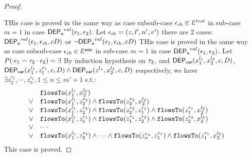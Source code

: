 \begin{proof}
\begin{enumerate}
\end{enumerate}
%
THis case is proved in the same way as case subsub-case $\mathtt{\epsilon}_{ih} \in \mathcal{E}^{test}$ in sub-case $m = 1$ in case $\mathsf{DEP_{\mathtt{e}}}^{val}(\mathtt{\epsilon}_1, \mathtt{\epsilon}_2)$.
%
Let $\mathtt{\epsilon}_{ih} = (z, l', n', v')$  there are 2 cases:
$\mathsf{DEP_{\mathtt{e}}}^{val}(\mathtt{\epsilon}_1, \mathtt{\epsilon}_{ih}, c D)$ or $\neg \mathsf{DEP_{\mathtt{e}}}^{val}(\mathtt{\epsilon}_1, \mathtt{\epsilon}_{ih}, c D)$
%
%
THis case is proved in the same way as case subsub-case $\mathtt{\epsilon}_{ih} \in \mathcal{E}^{\mathtt{{asn}}}$ in sub-case $m = 1$ in case $\mathsf{DEP_{\mathtt{e}}}^{val}(\mathtt{\epsilon}_1, \mathtt{\epsilon}_2)$.
%
Let $P(\cdot \mathtt{\epsilon}_1 \smallfrown \mathtt{\tau}_2 \cdot \mathtt{\epsilon}_2) = \exists$
By induction hypothesis on $\mathtt{\tau}_3$,
 and $\mathsf{DEP_{var}}(x_1^{l_1}, x_2^{l_2}, c, D)$, 
$\mathsf{DEP_{var}}(x_1^{l_1}, z_1^{r_1}, c, D) \land \mathsf{DEP_{var}}(z^{l_z}, x_2^{l_2}, c, D)$ respectively, 
we have $\exists z_2^{r_2}, \cdots, z_n^{r_2}, 1 \leq n \leq m'+1$ s.t.:
\[
\begin{array}{ll}
      & \mathtt{flowsTo}(x_1^{l_1}, x_2^{l_2}) \\
  \lor  & \mathtt{flowsTo}(x_1^{l_1}, z_2^{r_2}) \land \mathtt{flowsTo}(z_2^{r_2}, x_2^{l_2})\\
  \lor  & \mathtt{flowsTo}(x_1^{l_1}, z_2^{r_2}) \land \mathtt{flowsTo}(z_2^{r_2}, z_1^{r_1}) \land \mathtt{flowsTo}(z_1^{r_1}, x_2^{l_2}) \\
  \lor  & \mathtt{flowsTo}(x_1^{l_1}, z_1^{r_1}) \land \mathtt{flowsTo}(z_1^{r_1}, z_2^{r_2}) \land \mathtt{flowsTo}(z_2^{r_2}, x_2^{l_2}) \\
  \lor  & \cdots \\
  \lor  & \mathtt{flowsTo}(x_1^{l_1}, z_2^{r_2}) \land \cdots \land \mathtt{flowsTo}(z_n^{r_n}, z_1^{r_1}) \land \mathtt{flowsTo}(z_1^{r_1}, x_2^{l_2}) \\
\end{array}
\]This case is proved.
\end{proof}

